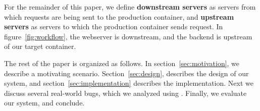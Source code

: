 \begin{itemize}[leftmargin=*,topsep=0pt,itemsep=-1ex,partopsep=1ex,parsep=1ex]

\end{itemize}


For the remainder of this paper, we define \textbf{downstream servers} as servers from which requests are being sent to the production container, and \textbf{upstream servers} as servers to which the production container sends request. 
In figure~\ref{fig:workflow}, the webserver is downstream, and the backend is upstream of our target container.

The rest of the paper is organized as follows.
In section~\ref{sec:motivation}, we describe a motivating scenario.
Section~\ref{sec:design}, describes the design of our system, and section~\ref{sec:implementation} describes the implementation.
Next we discuss several real-world bugs, which we analyzed using \parikshan.
Finally, we evaluate our system, and conclude. 

